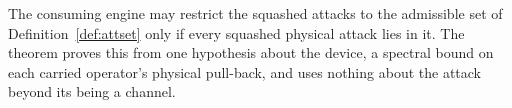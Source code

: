 
The consuming engine may restrict the squashed attacks to the admissible set
of Definition~\ref{def:attset} only if every squashed physical attack lies in
it. The theorem proves this from one hypothesis about the device, a spectral
bound on each carried operator's physical pull-back, and uses nothing about
the attack beyond its being a channel.

